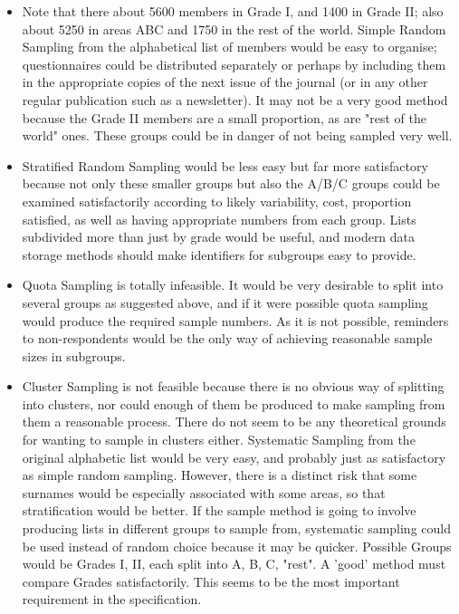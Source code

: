 \documentclass[a4paper,12pt]{article}
\begin{document}
\begin{itemize} 
\item Note that there about 5600 members in Grade I, and 1400 in Grade II; also about
5250 in areas ABC and 1750 in the rest of the world.
Simple Random Sampling from the alphabetical list of members would be easy to
organise; questionnaires could be distributed separately or perhaps by including them
in the appropriate copies of the next issue of the journal (or in any other regular
publication such as a newsletter). It may not be a very good method because the
Grade II members are a small proportion, as are "rest of the world" ones. These
groups could be in danger of not being sampled very well.
\item Stratified Random Sampling would be less easy but far more satisfactory because not
only these smaller groups but also the A/B/C groups could be examined satisfactorily
according to likely variability, cost, proportion satisfied, as well as having appropriate
numbers from each group. Lists subdivided more than just by grade would be useful,
and modern data storage methods should make identifiers for subgroups easy to
provide.
\item Quota Sampling is totally infeasible. It would be very desirable to split into several
groups as suggested above, and if it were possible quota sampling would produce the
required sample numbers. As it is not possible, reminders to non-respondents would
be the only way of achieving reasonable sample sizes in subgroups.
\item Cluster Sampling is not feasible because there is no obvious way of splitting into
clusters, nor could enough of them be produced to make sampling from them a
reasonable process. There do not seem to be any theoretical grounds for wanting to
sample in clusters either.
Systematic Sampling from the original alphabetic list would be very easy, and
probably just as satisfactory as simple random sampling. However, there is a distinct
risk that some surnames would be especially associated with some areas, so that
stratification would be better. If the sample method is going to involve producing
lists in different groups to sample from, systematic sampling could be used instead of
random choice because it may be quicker.
Possible Groups would be Grades I, II, each split into A, B, C, "rest". A 'good'
method must compare Grades satisfactorily. This seems to be the most important
requirement in the specification.

\end{itemize}
\end{document}
